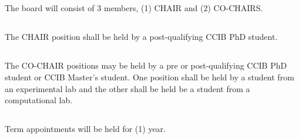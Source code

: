 \subsection{}

The board will consist of 3 members, (1) CHAIR and (2) CO-CHAIRS. 

\subsection{}

The CHAIR position shall be held by a post-qualifying CCIB PhD student.

\subsection{}

The CO-CHAIR positions may be held by a pre or post-qualifying CCIB PhD student or CCIB Master's student.  One position shall be held by a student from an experimental lab and the other shall be held be a student from a computational lab. 

\subsection{}

Term appointments will be held for (1) year.